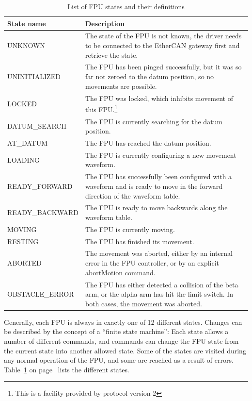 \documentclass[11pt,a4paper]{report}
\begin{document}
\begin{table}
    \begin{minipage}{0.8\textwidth}
  \begin{centering}
\begin{tabular}{|l|p{}|}
  \hline
  \textbf{State name} & \textbf{Description} \\
  \hline 
UNKNOWN & The state of the FPU is not known, the driver needs to
be connected to the EtherCAN gateway first and retrieve the state.\\
\hline
UNINITIALIZED & The FPU has been pinged successfully, but it was
  so far not zeroed to the datum position, so no movements are
  possible.\\
\hline
LOCKED & The FPU was locked, which inhibits movement of this
  FPU.\footnote{This is a facility provided by protocol version 2}\\
\hline
DATUM\_SEARCH & The FPU is currently searching for the datum
position.\\
\hline
AT\_DATUM      & The FPU has reached the datum position.\\
\hline
LOADING & The FPU is currently configuring a new movement waveform.\\
\hline
READY\_FORWARD & The FPU has successfully been configured with a waveform
and is ready to move in the forward
  direction of the waveform table.\\
\hline
READY\_BACKWARD& The FPU is ready to move backwards along the
  waveform table.\\
\hline
MOVING        & The FPU is currently moving.\\
\hline
RESTING       & The FPU has finished its movement.\\
\hline
ABORTED & The movement was aborted, either by an internal error
  in the FPU controller, or by an explicit abortMotion command.\\
\hline
OBSTACLE\_ERROR& The FPU has either detected a collision of the
  beta arm, or the alpha arm has hit the limit switch. In both cases, the
  movement was aborted. \\
\hline
\end{tabular}
\end{centering}
\end{minipage}
\caption{List of FPU states and their definitions}
\label{tab:fpustates}
\end{table}


Generally, each FPU is always in exactly one of 12 different states.
Changes can be described by the concept of a ``finite state machine'':
Each state allows a number of different commands, and commands can
change the FPU state from the current state into another allowed
state.  Some of the states are visited during any normal operation of
the FPU, and some are reached as a result of errors.
Table~\ref{tab:fpustates} on page~\pageref{tab:fpustates} lists the
different states.
\end{document}
